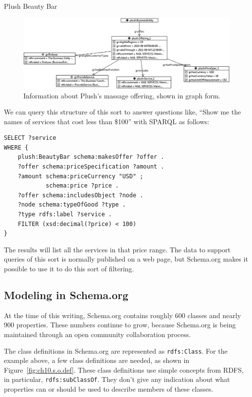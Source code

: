 \begin{example}{Plush Beauty Bar}
\begin{figure}
\centering
\includegraphics[width=5in]{media/ch14/f14-02.png}
\caption{Information about Plush's massage offering, shown in graph form.}
\label{fig:ch10.02}
\end{figure}



We can query this structure of this sort to answer questions like,
``Show me the names of services that
cost less than \$100'' with SPARQL as follows:

\begin{lstlisting}
SELECT ?service 
WHERE {
    plush:BeautyBar schema:makesOffer ?offer . 
    ?offer schema:priceSpecification ?amount .
    ?amount schema:priceCurrency "USD" ;
            schema:price ?price .
    ?offer schema:includesObject ?node .
    ?node schema:typeOfGood ?type .
    ?type rdfs:label ?service .
    FILTER (xsd:decimal(?price) < 100)
}
\end{lstlisting}


The results will list all the services in that price range.  The data to 
support queries of this sort is normally published on a web page, 
but Schema.org makes it possible to use it to do this sort of filtering. 
\end{example}





\subsection{Modeling in Schema.org}


At the time of this writing, Schema.org contains roughly 600 classes and nearly 
900 properties.  These numbers continue to grow, because Schema.org is being
maintained through an open community collaboration process. 

The class definitions in Schema.org are represented as \texttt{rdfs:Class}.  
For the 
example above, a few class definitions are needed, as shown in Figure~\ref{fig:ch10.s.o.def}.  These class definitions use simple concepts from RDFS, in particular, 
\texttt{rdfs:subClassOf}.  They don't give any indication about what
properties can or should be used to describe members of these classes. 



